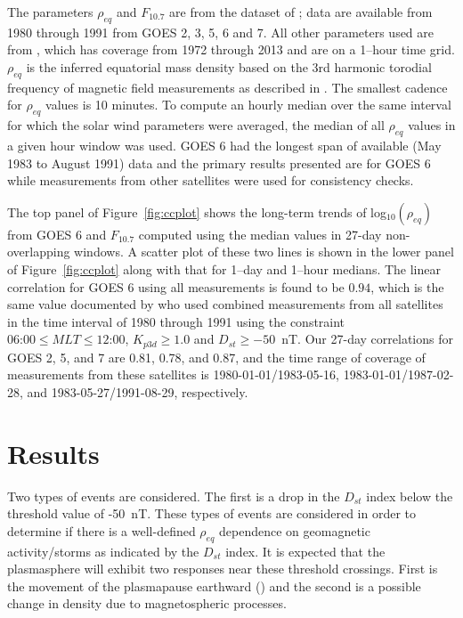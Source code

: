 \documentclass[12pt]{article}
\begin{document}
The parameters $\rho_{eq}$ and $F_{10.7}$ are from the dataset of \cite{Takahashi2010}; data are available from 1980 through 1991 from GOES 2, 3, 5, 6 and 7.  All other parameters used are from \cite{Kondrashov2014ReconstructionOfGaps}, which has coverage from 1972 through 2013 and are on a 1--hour time grid. $\rho_{eq}$ is the inferred equatorial mass density based on the 3rd harmonic torodial frequency of magnetic field measurements as described in \cite{Takahashi2010}.  The smallest cadence for $\rho_{eq}$ values is 10 minutes.  To compute an hourly median over the same interval for which the solar wind parameters were averaged, the median of all $\rho_{eq}$ values in a given hour window was used. GOES 6 had the longest span of available (May 1983 to August 1991) data and the primary results presented are for GOES 6 while measurements from other satellites were used for consistency checks.


The top panel of Figure~\ref{fig:ccplot} shows the long-term trends of log$_{10}(\rho_{eq})$ from GOES 6 and $F_{10.7}$ computed using the median values in 27-day non-overlapping windows.  A scatter plot of these two lines is shown in the lower panel of Figure~\ref{fig:ccplot} along with that for 1--day and 1--hour medians.  The linear correlation for GOES 6 using all measurements is found to be $0.94$, which is the same value documented by \cite{Takahashi2010} who used combined measurements from all satellites in the time interval of 1980 through 1991 using the constraint $06\mbox{:}00 \leq MLT \le 12\mbox{:}00$, $K_{p3d}\ge1.0$ and $D_{st}\ge -50$~nT.  Our 27-day correlations for GOES 2, 5, and 7 are 0.81, 0.78, and 0.87, and the time range of coverage of measurements from these satellites is 1980-01-01/1983-05-16, 1983-01-01/1987-02-28, and 1983-05-27/1991-08-29, respectively.

\section{Results}

Two types of events are considered. The first is a drop in the $D_{st}$ index below the threshold value of -50~nT. These types of events are considered in order to determine if there is a well-defined $\rho_{eq}$ dependence on geomagnetic activity/storms as indicated by the $D_{st}$ index.  It is expected that the plasmasphere will exhibit two responses near these threshold crossings.  First is the movement of the plasmapause earthward (\cite{LemaireEarthsPlasmasphere}) and the second is a possible change in density due to magnetospheric processes. 
\end{document}
